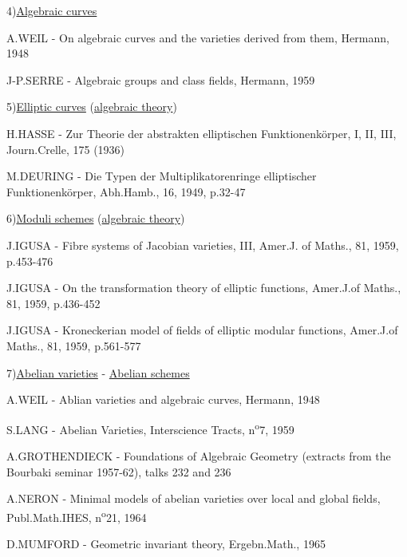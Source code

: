 \clearpage
{}
\reversemarginpar
{}
\normalmarginpar
{}

4)\quad \uline{Algebraic curves}

\reversemarginpar
{}
A.WEIL - On \makebox[0pt][l]{\deleted{\unsure{-|=}}}algebraic curves and the varieties derived from them, Hermann, 1948

J-P.SERRE - Algebraic groups and class fields, Hermann, 1959

5)\quad \uline{Elliptic curves} (\uline{algebraic theory})

H.HASSE - Zur Theorie der abstrakten elliptischen Funktionenkörper, I, II, III, Journ.Crelle, 175 (1936)

M.DEURING - Die Typen der Multiplikatorenringe elliptischer Funktionenkörper, Abh.Hamb., 16, 1949, p.32-47

6)\quad \uline{Moduli schemes} (\uline{algebraic theory})

J.IGUSA - Fibre systems of Jacobian varieties, III, Amer.J. of Maths., 81, 1959, p.453-476

J.IGUSA - On the transformation theory of elliptic functions, Amer.J.of Maths., 81, 1959, p.436-452

J.IGUSA - Kroneckerian model of fields of elliptic modular functions, Amer.J.of Maths., 81, 1959, p.561-577

7)\quad \uline{Abelian varieties} - \uline{Abelian schemes}

A.WEIL - Ablian varieties and algebraic curves, Hermann, 1948

S.LANG - Abelian Varieties, Interscience Tracts, n\textsuperscript{o}7, 1959

A.GROTHENDIECK - Foundations of Algebraic Geometry (extracts from the Bourbaki seminar 1957-62), talks 232 and 236

A.NERON - Minimal models of abelian varieties over local and global fields, Publ.Math.IHES, n\textsuperscript{o}21, 1964

D.MUMFORD - Geometric invariant theory, Ergebn.Math., 1965
\normalmarginpar
